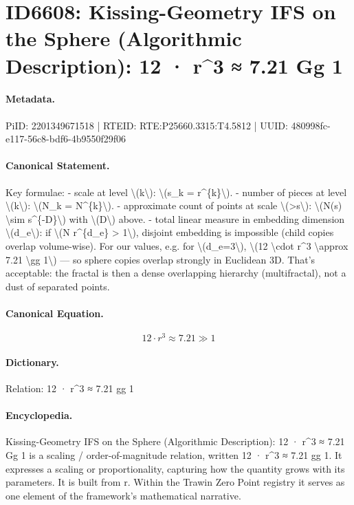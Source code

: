 \section*{ID6608: Kissing-Geometry IFS on the Sphere (Algorithmic Description): 12 · r\textasciicircum{}3 ≈ 7.21 Gg 1}
\paragraph{Metadata.}
PiID: 2201349671518 | RTEID: RTE:P25660.3315:T4.5812 | UUID: 480998fc-e117-56c8-bdf6-4b9550f29f06

\paragraph{Canonical Statement.}
Key formulae: - scale at level \textbackslash{}(k\textbackslash{}): \textbackslash{}(s\_k = r\textasciicircum{}\{k\}\textbackslash{}). - number of pieces at level \textbackslash{}(k\textbackslash{}): \textbackslash{}(N\_k = N\textasciicircum{}\{k\}\textbackslash{}). - approximate count of points at scale \textbackslash{}(>s\textbackslash{}): \textbackslash{}(N(s) \textbackslash{}sim s\textasciicircum{}\{-D\}\textbackslash{}) with \textbackslash{}(D\textbackslash{}) above. - total linear measure in embedding dimension \textbackslash{}(d\_e\textbackslash{}): if \textbackslash{}(N r\textasciicircum{}\{d\_e\} > 1\textbackslash{}), disjoint embedding is impossible (child copies overlap volume-wise). For our values, e.g. for \textbackslash{}(d\_e=3\textbackslash{}), \textbackslash{}(12 \textbackslash{}cdot r\textasciicircum{}3 \textbackslash{}approx 7.21 \textbackslash{}gg 1\textbackslash{}) — so sphere copies overlap strongly in Euclidean 3D. That’s acceptable: the fractal is then a dense overlapping hierarchy (multifractal), not a dust of separated points.

\paragraph{Canonical Equation.}
\[
12 \cdot r^3 \approx 7.21 \gg 1
\]

\paragraph{Dictionary.}
Relation: 12 · r\textasciicircum{}3 ≈ 7.21 gg 1

\paragraph{Encyclopedia.}
Kissing-Geometry IFS on the Sphere (Algorithmic Description): 12 · r\textasciicircum{}3 ≈ 7.21 Gg 1 is a scaling / order-of-magnitude relation, written 12 · r\textasciicircum{}3 ≈ 7.21 gg 1. It expresses a scaling or proportionality, capturing how the quantity grows with its parameters. It is built from r. Within the Trawin Zero Point registry it serves as one element of the framework's mathematical narrative.
